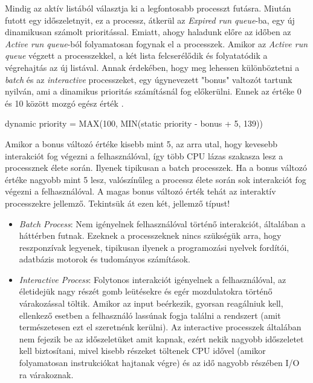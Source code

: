 Mindig az aktív listából választja ki a legfontosabb processzt futásra. Miután futott egy időszeletnyit, ez a processz, átkerül az \textit{Expired run queue}-ba, egy új dinamikusan számolt prioritással.
Emiatt, ahogy haladunk előre az időben az \textit{Active run queue}-ból folyamatosan fogynak el a processzek.  Amikor az \textit{Active run queue} végzett a processzekkel, a két lista felcserélődik és folyatatódik a végrehajtás az új listával.
Annak érdekében, hogy meg lehessen különböztetni a \textit{batch} és az \textit{interactive} processzeket, egy úgynevezett "bonus" valtozót tartunk nyilván, ami a dinamikus prioritás számításnál fog előkerülni. Ennek az értéke 0 és 10 között mozgó egész érték \cite{aas2005understanding}.
\begin{cpp}
dynamic priority = MAX(100, MIN(static priority - bonus + 5, 139))
\end{cpp}
Amikor a bonus változó értéke kisebb mint 5, az arra utal, hogy kevesebb interakciót fog végezni a felhasználóval, így több CPU lázas szakasza lesz a processznek élete során. Ilyenek tipikusan a batch processzek.
Ha a bonus változó értéke nagyobb mint 5 lesz, valószínűleg a processz élete során sok interakciót fog végezni a felhasználóval. A magas bonus változó érték tehát az interaktív processzekre jellemző. Tekintsük át ezen két, jellemző típust!
\begin{itemize}
\item \textit{Batch Process}: Nem igényelnek felhasználóval történő interakciót, általában a háttérben futnak. Ezeknek a processzeknek nincs szükségük arra, hogy reszponzívak legyenek, tipikusan ilyenek a programozási nyelvek fordítói, adatbázis motorok és tudományos számítások.
\item \textit{Interactive Process}: Folytonos interakciót igényelnek a felhasználóval, az életidejük nagy részét gomb leütésekre és egér mozdulatokra történő várakozással töltik.
Amikor az input beérkezik, gyorsan reagálniuk kell, ellenkező esetben a felhasználó lassúnak fogja találni a rendszert (amit természetesen ezt el szeretnénk kerülni).
Az interactive processzek általában nem fejezik be az időszeletüket amit kapnak, ezért nekik nagyobb időszeletet kell biztosítani, mivel kisebb részeket töltenek CPU idővel (amikor folyamatosan instrukciókat hajtanak végre) és az idő nagyobb részében I/O ra várakoznak.
\end{itemize}



